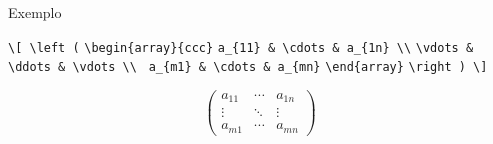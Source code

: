 \begin{frame}[fragile]{Exemplo}

\verb|\[ \left (| \newline
\verb|\begin{array}{ccc}| \newline
\verb|a_{11} & \cdots & a_{1n} \\| \newline
\verb|\vdots & \ddots & \vdots \\ | \newline
\verb|a_{m1} & \cdots & a_{mn}| \newline
\verb|\end{array}| \newline
\verb|\right ) \] | \newline

\[ \left (
\begin{array}{ccc}
a_{11} & \cdots & a_{1n} \\
\vdots & \ddots & \vdots \\
a_{m1} & \cdots & a_{mn}
\end{array} \right ) \]


\end{frame}
